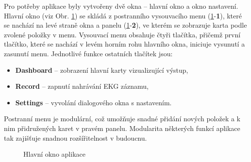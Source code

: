 Pro potřeby aplikace byly vytvořeny dvě okna -- hlavní okno a okno nastavení.
Hlavní okno (viz Obr. \ref{fig:app_main_window}) se skládá z postranního
vysouvacího menu (\ref{fig:app_main_window}-\textbf{1}), které se nachází na
levé straně okna a panelu (\ref{fig:app_main_window}-\textbf{2}), ve kterém se
zobrazuje karta podle zvolené položky v menu. Vysouvací menu obsahuje čtyři
tlačítka, přičemž první tlačítko, které se nachází v levém horním rohu hlavního
okna, iniciuje vysunutí a zasunutí menu. Jednotlivé funkce ostatních tlačítek
jsou:
\begin{itemize}[noitemsep]
    \item \textbf{Dashboard} -- zobrazení hlavní karty vizualizující výstup,
    \item \textbf{Record} -- zapnutí nahrávání EKG záznamu,
    \item \textbf{Settings} -- vyvolání dialogového okna s nastavením.
\end{itemize}
Postranní menu je modulární, což umožňuje snadné přidání nových položek a k nim
přidružených karet v pravém panelu. Modularita některých funkcí aplikace tak
zajišťuje snadnou rozšířitelnost v budoucnu.

\begin{figure}[h]
    \begin{center}
        \textcolor{cyan}{\fboxrule=0.5pt\fboxsep=0pt}
        \caption{Hlavní okno aplikace}
        \label{fig:app_main_window}
    \end{center}
\end{figure}

